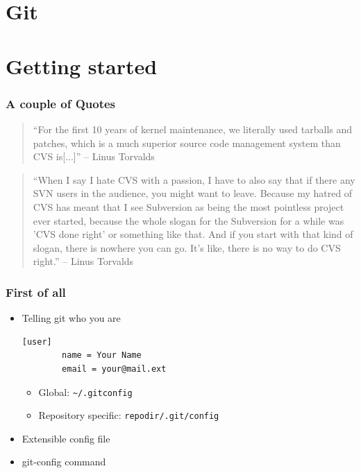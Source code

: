 \section{Git}

\section{Getting started}

\begin{frame}
  \frametitle{A couple of Quotes}
  {\scriptsize
  \begin{quote}
    ``For the first 10 years of kernel maintenance, we literally used
    tarballs and patches, which is a much superior source code
    management system than CVS is[...]'' -- Linus Torvalds
  \end{quote}

  \begin{quote}
    ``When I say I hate CVS with a passion, I have to also say that if
    there any SVN users in the audience, you might
    want to leave. Because my hatred of CVS has meant that I see
    Subversion as being the most pointless project ever started,
    because the whole slogan for the Subversion for a while was 'CVS
    done right' or something like that. And if you start with that
    kind of slogan, there is nowhere you can go. It's like, there is
    no way to do CVS right.'' -- Linus Torvalds
  \end{quote}
}
\end{frame}

\begin{frame}[fragile]
  \frametitle{First of all}
  \begin{itemize}
  \item Telling git who you are
    {\scriptsize
\begin{verbatim}
[user]
        name = Your Name
        email = your@mail.ext
\end{verbatim} 
    }
    \begin{itemize}
    \item Global: \verb|~/.gitconfig|
    \item Repository specific: \verb|repodir/.git/config|
    \end{itemize}
  \item Extensible config file
  \item git-config command
  \end{itemize}
\end{frame}

